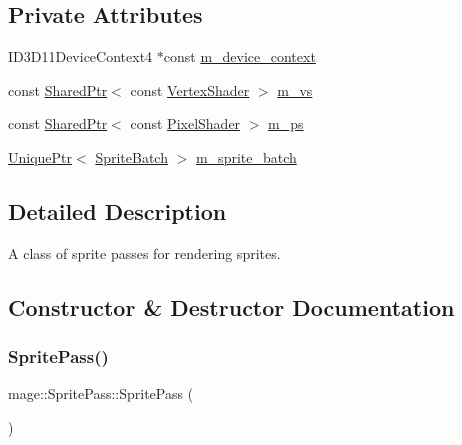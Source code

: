 \subsection*{Private Attributes}
\begin{DoxyCompactItemize}
\item 
I\+D3\+D11\+Device\+Context4 $\ast$const \hyperlink{classmage_1_1_sprite_pass_aee6b9924a954629c19385c70ecf91d0a}{m\+\_\+device\+\_\+context}
\item 
const \hyperlink{namespacemage_a1e01ae66713838a7a67d30e44c67703e}{Shared\+Ptr}$<$ const \hyperlink{classmage_1_1_vertex_shader}{Vertex\+Shader} $>$ \hyperlink{classmage_1_1_sprite_pass_ac6e86ad76e04aa3d2e266e9491d17f81}{m\+\_\+vs}
\item 
const \hyperlink{namespacemage_a1e01ae66713838a7a67d30e44c67703e}{Shared\+Ptr}$<$ const \hyperlink{namespacemage_a27ecaf266420ee7a494d64edc0757129}{Pixel\+Shader} $>$ \hyperlink{classmage_1_1_sprite_pass_a03965c38e565dbf0cbabdb35bc836124}{m\+\_\+ps}
\item 
\hyperlink{namespacemage_a3316d7143a973e37adf1110f2e80ca31}{Unique\+Ptr}$<$ \hyperlink{classmage_1_1_sprite_batch}{Sprite\+Batch} $>$ \hyperlink{classmage_1_1_sprite_pass_a9083152ae0681429df4dd0fce533f7dc}{m\+\_\+sprite\+\_\+batch}
\end{DoxyCompactItemize}


\subsection{Detailed Description}
A class of sprite passes for rendering sprites. 

\subsection{Constructor \& Destructor Documentation}
\hypertarget{classmage_1_1_sprite_pass_abe484eb7c99dabc585d874029c85013f}{}\label{classmage_1_1_sprite_pass_abe484eb7c99dabc585d874029c85013f} 
\subsubsection{\texorpdfstring{Sprite\+Pass()}{SpritePass()}\hspace{0.1cm}{\footnotesize\ttfamily [1/3]}}
{\footnotesize\ttfamily mage\+::\+Sprite\+Pass\+::\+Sprite\+Pass (\begin{DoxyParamCaption}{ }\end{DoxyParamCaption})}

